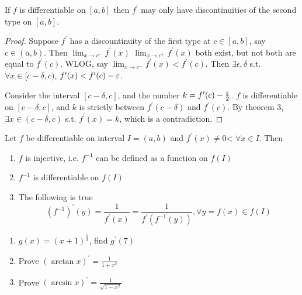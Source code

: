 \begin{corollary}
    If $f$ is differentiable on $[a,b]$ then $f^{\prime}$ may 
    only have discontinuities of the second type on $[a,b]$.
\end{corollary}

\begin{proof}
    \medskip

    Suppose $f^{\prime}$ has a discountinuity 
    of the first type
    at $c \in [a,b]$, say
    $c \in (a, b)$. Then 
    $\lim_{x \to c^{-}}f^{\prime}(x)$
    $\lim_{x \to c^{+}}f^{\prime}(x)$ both exist, but not both are
    equal to $f^{\prime}(c)$. 
    WLOG, say $\lim_{x \to c^{-}}f^{\prime}(x) < f^{\prime}(c)$.
    Then $\exists \epsilon, \delta$ s.t. 
    $\forall x \in [c - \delta, c)$, $f^{\prime}(x) < f^{\prime}(c) - \varepsilon$.
    \medskip

    Consider the interval $[c - \delta, c]$, and the number $k = f^{\prime}(c) - \frac{\varepsilon}{2}$.
    $f$ is differentiable on $[c-\delta, c]$,
    and $k$ is strictly between $f^{\prime}(c -\delta)$ and $f^{\prime}(c)$.
    By theorem 3, $\exists x \in (c - \delta, c)$ s.t. $f^{\prime}(x) = k$,
    which is a contradiction.
\end{proof}

\begin{theorem}
    \label{thm:inverse-function-theorem}
    Let $f$ be differentiable on interval $I = (a,b)$ and $f^{\prime}(x) \neq 0$<
    $\forall x \in I$. Then 
    \begin{enumerate}
        \item $f$ is injective, i.e. $f^{-1}$ can be defined as a function on $f(I)$
        \item $f^{-1}$ is differentiable on $f(I)$
        \item The following is true
    \[
        (f^{-1})^{\prime}(y) = 
        \frac{1}{f^{\prime}(x)}
        = \frac{1}{f^{\prime} \left( f^{-1}(y) \right) }, \forall y = f(x) \in f(I)
    \]
    \end{enumerate} 
\end{theorem}

\begin{example}
    \medskip
    \begin{enumerate}
        \item $g(x) = (x + 1)^{ \frac{1}{3}}$, find $g^{\prime}(7)$
        \item Prove $(\arctan x)^{\prime} = \frac{1}{1 + x^{2}}$
        \item Prove $(\arcsin x)^{\prime} = \frac{1}{ \sqrt{1 - x^{2}}}$
    \end{enumerate} 
\end{example}

